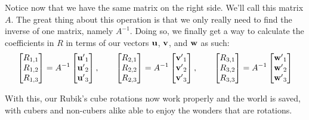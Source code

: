 
Notice now that we have the same matrix on the right side. We'll call this
matrix \( A \). The great thing about this operation is that we only really
need to find the inverse of one matrix, namely \( A^{-1} \). Doing so, we
finally get a way to calculate the coefficients in \( R \) in terms of our vectors \( \mathbf{u} \), \( \mathbf{v} \), and \( \mathbf{w} \) as such:
\[
    \begin{bmatrix} R_{1,1} \\ R_{1,2} \\ R_{1,3} \end{bmatrix} = A^{-1} \begin{bmatrix} \mathbf{u'}_1 \\ \mathbf{u'}_2 \\ \mathbf{u'}_3 \end{bmatrix}, \qquad \begin{bmatrix} R_{2,1} \\ R_{2,2} \\ R_{2,3} \end{bmatrix} = A^{-1} \begin{bmatrix} \mathbf{v'}_1 \\ \mathbf{v'}_2 \\ \mathbf{v'}_3 \end{bmatrix}, \qquad \begin{bmatrix} R_{3,1} \\ R_{3,2} \\ R_{3,3} \end{bmatrix} = A^{-1} \begin{bmatrix} \mathbf{w'}_1 \\ \mathbf{w'}_2 \\ \mathbf{w'}_3 \end{bmatrix} 
\]
\endgroup

With this, our Rubik's cube rotations now work properly  and the world is saved,
with cubers and non-cubers alike able to enjoy the wonders that are rotations.
